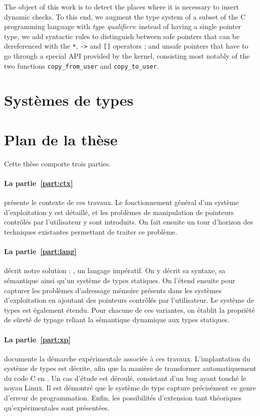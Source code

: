 The object of this work is to detect the places where it is necessary to insert
dynamic checks. To this end, we augment the type system of a subset of the C
programming language with \emph{type qualifiers}: instead of having a single
pointer type, we add syntactic rules to distinguish between safe pointers that
can be dereferenced with the \texttt{*}, \texttt{->} and \texttt{[]} operators ;
and unsafe pointers that have to go through a special API provided by the
kernel, consisting most notably of the two functions \texttt{copy\_from\_user}
and \texttt{copy\_to\_user}.

\section{Systèmes de types}

\section{Plan de la thèse}

Cette thèse comporte trois parties.

\paragraph{La partie~\ref{part:ctx}} présente le contexte de ces travaux. Le
fonctionnement général d'un système d'exploitation y est détaillé, et les
problèmes de manipulation de pointeurs contrôlés par l'utilisateur y sont
introduits. On fait ensuite un tour d'horizon des techniques existantes
permettant de traiter ce problème.

\paragraph{La partie~\ref{part:lang}} décrit notre solution : \langname, un
langage impératif. On y décrit sa syntaxe, sa sémantique ainsi qu'un système de
types statiques. On l'étend ensuite pour capturer les problèmes d'adressage
mémoire présents dans les systèmes d'exploitation en ajoutant des pointeurs
contrôlés par l'utilisateur. Le système de types est également étendu. Pour
chacune de ces variantes, on établit la propriété de sûreté de typage reliant la
sémantique dynamique aux types statiques.

\paragraph{La partie~\ref{part:xp}} documente la démarche expérimentale associée
à ces travaux. L'implantation du système de types est décrite, afin que la
manière de transformer automatiquement du code C en \langname. Un cas d'étude
est déroulé, consistant d'un bug ayant touché le noyau Linux. Il est démontré
que le système de type capture précisément ce genre d'erreur de programmation.
Enfin, les possibilités d'extension tant théoriques qu'expérimentales sont
présentées.

